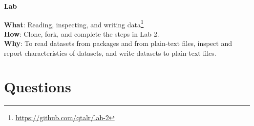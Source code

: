 \documentclass[
  letterpaper,
]{latex/krantz}
\DeclareRobustCommand{\href}[2]{#2\footnote{\url{#1}}}
\begin{document}
\begin{tcolorbox}[enhanced jigsaw, arc=.35mm, leftrule=.75mm, rightrule=.15mm, opacityback=0, colback=white, breakable, bottomrule=.15mm, left=2mm, toprule=.15mm]

\textbf{ Lab}

\textbf{What}: \href{https://github.com/qtalr/lab-2}{Reading,
inspecting, and writing data}\\
\textbf{How}: Clone, fork, and complete the steps in Lab 2.\\
\textbf{Why}: To read datasets from packages and from plain-text files,
inspect and report characteristics of datasets, and write datasets to
plain-text files.

\end{tcolorbox}

\hypertarget{questions-2}{%
\section*{Questions}\label{questions-2}}

\end{document}
